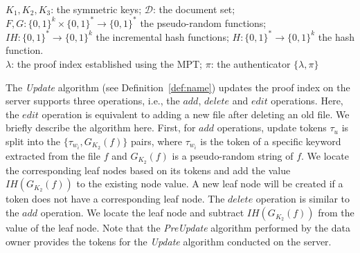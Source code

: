 \begin{algorithm}[t]
  \caption{$Init$}
  \label{alg:Init}
  \begin{algorithmic}[1]
    \REQUIRE ~~\\{$K_1,K_2,K_3$: the symmetric keys;  $\mathcal{D}$: the document set;  $F, G: \{0, 1\}^k \times \{0, 1\}^* \rightarrow \{0, 1\}^*$ the pseudo-random functions; $IH: \{0, 1\}^* \rightarrow \{0, 1\}^k$ the incremental hash functions; $H: \{0, 1\}^* \rightarrow \{0, 1\}^k$ the hash function.}
    \ENSURE ~~\\{$\lambda$: the proof index established using the MPT;
                 $\pi$: the authenticator}
              \ENDFOR
              \RETURN $\{\lambda,\pi\}$
  \end{algorithmic}
\end{algorithm}


The {\it Update} algorithm (see Definition~\ref{def:name}) updates the proof index on the server  supports three operations, i.e., the $add$, $delete$ and $edit$ operations. Here, the $edit$ operation is equivalent to adding a new file after deleting an old file. We briefly describe the algorithm here.  First, for $add$ operations, update tokens $\tau_u$ is split into the $\{\tau_{w_i}, G_{K_2} (f)\}$ pairs, where $\tau_{w_i}$ is the token of a specific keyword extracted from the file $f$ and $G_{K_2} (f)$ is a pseudo-random string of $f$. We locate the corresponding leaf nodes based on its tokens and add the value $IH (G_{K_2} (f))$ to the existing node value. A new leaf node will be created if a token does not have a corresponding leaf node. The $delete$ operation is similar to the $add$ operation. We locate the leaf node and subtract $IH (G_{K_2} (f))$ from the value of the leaf node. Note that the {\it PreUpdate} algorithm performed by the data owner provides the tokens for the {\it Update} algorithm conducted on the server.

